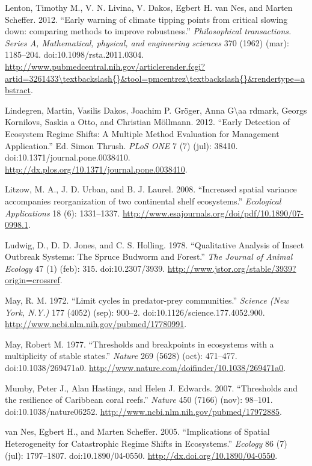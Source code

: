 \documentclass[author-year, review]{elsarticle} %
\begin{document}
Lenton, Timothy M., V. N. Livina, V. Dakos, Egbert H. van Nes, and
Marten Scheffer. 2012. ``Early warning of climate tipping points from
critical slowing down: comparing methods to improve robustness.''
\emph{Philosophical transactions. Series A, Mathematical, physical, and
engineering sciences} 370 (1962) (mar): 1185--204.
doi:10.1098/rsta.2011.0304.
\url{http://www.pubmedcentral.nih.gov/articlerender.fcgi?artid=3261433\textbackslash{}\&tool=pmcentrez\textbackslash{}\&rendertype=abstract}.

Lindegren, Martin, Vasilis Dakos, Joachim P. Gröger, Anna
G\textbackslash{}aa rdmark, Georgs Kornilovs, Saskia a Otto, and
Christian Möllmann. 2012. ``Early Detection of Ecosystem Regime Shifts:
A Multiple Method Evaluation for Management Application.'' Ed. Simon
Thrush. \emph{PLoS ONE} 7 (7) (jul): 38410.
doi:10.1371/journal.pone.0038410.
\url{http://dx.plos.org/10.1371/journal.pone.0038410}.

Litzow, M. A., J. D. Urban, and B. J. Laurel. 2008. ``Increased spatial
variance accompanies reorganization of two continental shelf
ecosystems.'' \emph{Ecological Applications} 18 (6): 1331--1337.
\url{http://www.esajournals.org/doi/pdf/10.1890/07-0998.1}.

Ludwig, D., D. D. Jones, and C. S. Holling. 1978. ``Qualitative Analysis
of Insect Outbreak Systems: The Spruce Budworm and Forest.'' \emph{The
Journal of Animal Ecology} 47 (1) (feb): 315. doi:10.2307/3939.
\url{http://www.jstor.org/stable/3939?origin=crossref}.

May, R. M. 1972. ``Limit cycles in predator-prey communities.''
\emph{Science (New York, N.Y.)} 177 (4052) (sep): 900--2.
doi:10.1126/science.177.4052.900.
\url{http://www.ncbi.nlm.nih.gov/pubmed/17780991}.

May, Robert M. 1977. ``Thresholds and breakpoints in ecosystems with a
multiplicity of stable states.'' \emph{Nature} 269 (5628) (oct):
471--477. doi:10.1038/269471a0.
\url{http://www.nature.com/doifinder/10.1038/269471a0}.

Mumby, Peter J., Alan Hastings, and Helen J. Edwards. 2007. ``Thresholds
and the resilience of Caribbean coral reefs.'' \emph{Nature} 450 (7166)
(nov): 98--101. doi:10.1038/nature06252.
\url{http://www.ncbi.nlm.nih.gov/pubmed/17972885}.

van Nes, Egbert H., and Marten Scheffer. 2005. ``Implications of Spatial
Heterogeneity for Catastrophic Regime Shifts in Ecosystems.''
\emph{Ecology} 86 (7) (jul): 1797--1807. doi:10.1890/04-0550.
\url{http://dx.doi.org/10.1890/04-0550}.
\end{document}
